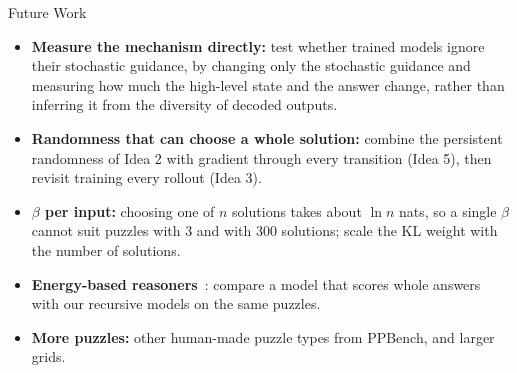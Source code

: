 \documentclass[aspectratio=169,10pt]{beamer}
\begin{document}

\begin{frame}{Future Work}
  \footnotesize
  \begin{itemize}\setlength{\itemsep}{0.5em}
    \item \textbf{Measure the mechanism directly:} test whether trained models ignore their stochastic guidance, by changing only the stochastic guidance and measuring how much the high-level state and the answer change, rather than inferring it from the diversity of decoded outputs.
    \item \textbf{Randomness that can choose a whole solution:} combine the persistent randomness of Idea 2 with gradient through every transition (Idea 5), then revisit training every rollout (Idea 3).
    \item \textbf{$\beta$ per input:} choosing one of $n$ solutions takes about $\ln n$ nats, so a single $\beta$ cannot suit puzzles with 3 and with 300 solutions; scale the KL weight with the number of solutions.
    \item \textbf{Energy-based reasoners}~\cite{chen2026,hoover2026}: compare a model that scores whole answers with our recursive models on the same puzzles.
    \item \textbf{More puzzles:} other human-made puzzle types from PPBench, and larger grids.
  \end{itemize}
\end{frame}


\end{document}
